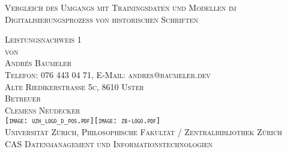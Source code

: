 

\begin{titlepage}

\begin{center}
\Large
\textsc{Vergleich des Umgangs mit Trainingsdaten und Modellen im Digitalisierungsprozess von historischen Schriften}\\

\vspace{2cm}

\textsc{Leistungsnachweis 1\\[0.5\baselineskip]
 von\\[0.5\baselineskip]
Andrés Baumeler\\
{\normalsize \textsc{Telefon: 076 443 04 71, E-Mail: andres@baumeler.dev }}\\
{\normalsize \textsc{Alte Riedikerstrasse 5c, 8610 Uster}}}\\


\vspace{3cm}
\textsc{Betreuer\\
Clemens Neudecker}\\

\vspace{2cm}
\textsc{ \texttt{[image: uzh\_logo\_d\_pos.pdf]}\hspace{1cm}\texttt{[image: zb-logo.pdf]} \\
\normalsize{Universität Zürich, Philosophische Fakultät  / Zentralbibliothek Zürich}\\
\normalsize{CAS Datenmanagement und Informationstechnologien}}\\

\end{center}

\end{titlepage}
